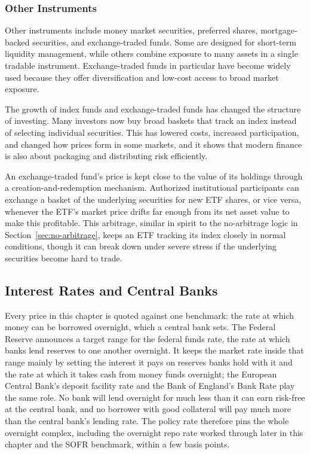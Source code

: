 \documentclass[../ai_in_finance]{subfiles}
\begin{document}
\subsubsection*{Other Instruments}

Other instruments include money market securities, preferred shares, mortgage-backed securities, and exchange-traded funds. Some are designed for short-term liquidity management, while others combine exposure to many assets in a single tradable instrument. Exchange-traded funds in particular have become widely used because they offer diversification and low-cost access to broad market exposure.

The growth of index funds and exchange-traded funds has changed the structure of investing. Many investors now buy broad baskets that track an index instead of selecting individual securities. This has lowered costs, increased participation, and changed how prices form in some markets, and it shows that modern finance is also about packaging and distributing risk efficiently.

An exchange-traded fund's price is kept close to the value of its holdings through a creation-and-redemption mechanism. Authorized institutional participants can exchange a basket of the underlying securities for new ETF shares, or vice versa, whenever the ETF's market price drifts far enough from its net asset value to make this profitable. This arbitrage, similar in spirit to the no-arbitrage logic in Section~\ref{sec:no-arbitrage}, keeps an ETF tracking its index closely in normal conditions, though it can break down under severe stress if the underlying securities become hard to trade.

\subsection{Interest Rates and Central Banks}
\label{sec:rates-central-banks}

Every price in this chapter is quoted against one benchmark: the rate at which money can be borrowed overnight, which a central bank sets. The Federal Reserve announces a target range for the federal funds rate, the rate at which banks lend reserves to one another overnight. It keeps the market rate inside that range mainly by setting the interest it pays on reserves banks hold with it and the rate at which it takes cash from money funds overnight; the European Central Bank's deposit facility rate and the Bank of England's Bank Rate play the same role. No bank will lend overnight for much less than it can earn risk-free at the central bank, and no borrower with good collateral will pay much more than the central bank's lending rate. The policy rate therefore pins the whole overnight complex, including the overnight repo rate worked through later in this chapter and the SOFR benchmark, within a few basis points.
\end{document}
